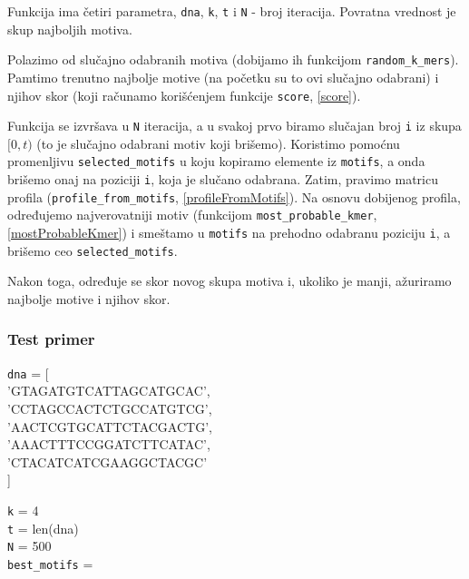Funkcija ima četiri parametra, \texttt{dna}, \texttt{k}, \texttt{t} i \texttt{N} - broj iteracija. Povratna vrednost je skup najboljih motiva.

Polazimo od slučajno odabranih motiva (dobijamo ih funkcijom \texttt{random\_k\_mers}). Pamtimo trenutno najbolje motive (na početku su to ovi slučajno odabrani) i njihov skor (koji računamo korišćenjem funkcije \texttt{score}, \ref{score}).

Funkcija se izvršava u \texttt{N} iteracija, a u svakoj prvo biramo slučajan broj \texttt{i} iz skupa $[0, t)$ (to je slučajno odabrani motiv koji brišemo). Koristimo pomoćnu promenljivu \texttt{selected\_motifs} u koju kopiramo elemente iz \texttt{motifs}, a onda brišemo onaj na poziciji \texttt{i}, koja je slučano odabrana. Zatim, pravimo matricu profila (\texttt{profile\_from\_motifs}, \ref{profileFromMotifs}). Na osnovu dobijenog profila, određujemo najverovatniji motiv (funkcijom \texttt{most\_probable\_kmer}, \ref{mostProbableKmer}) i smeštamo u \texttt{motifs} na prehodno odabranu poziciju \texttt{i}, a brišemo ceo \texttt{selected\_motifs}.

Nakon toga, određuje se skor novog skupa motiva i, ukoliko je manji, ažuriramo najbolje motive i njihov skor.
  





\subsubsection{Test primer}
\noindent\texttt{dna} = [ \\
'GTAGATGTCATTAGCATGCAC', \\
'CCTAGCCACTCTGCCATGTCG', \\
'AACTCGTGCATTCTACGACTG', \\
'AAACTTTCCGGATCTTCATAC', \\
'CTACATCATCGAAGGCTACGC' \\
]

\noindent \texttt{k} = 4
\\\texttt{t} = len(dna)
\\\texttt{N} = 500
\\\texttt{best\_motifs} =